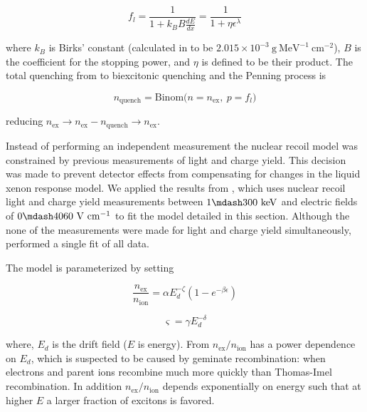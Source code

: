 \begin{equation}
f_l = \frac{1}{1 + k_{B}B \frac{dE}{dx}} = \frac{1}{1 + \eta \epsilon^{\lambda}}
\label{eq:er_nr_calibrations_parameter_determ_nr_birks}
\end{equation}

\noindent where $k_B$ is Birks' constant (calculated in  to be $2.015 \times 10^{-3}\ \mathrm{g\ MeV^{-1}\ cm^{-2}}$),
$B$ is the coefficient for the stopping power, and $\eta$ is defined to be their product.  The total quenching from to biexcitonic
quenching
and the Penning process is

\begin{equation}
n_{\mathrm{quench}} = \mathrm{Binom} \big( n = n_{\mathrm{ex}},\ p = f_l \big)
\end{equation}

\noindent reducing $n_{\mathrm{ex}} \rightarrow n_{\mathrm{ex}} - n_{\mathrm{quench}} \rightarrow n_{\mathrm{ex}}$.

Instead of performing an independent measurement the nuclear recoil model was constrained by previous measurements of light and charge
yield.  This decision was made to prevent detector effects from compensating for changes
in the liquid xenon response model.  We applied the results from , which uses nuclear recoil light and charge yield
measurements between $1 \mdash 300\ \mathrm{keV}$ and electric fields of $0 \mdash 4060\ \mathrm{V\ cm^{-1}}$ to fit the model
detailed in this section.  Although the none of the measurements were made for light and charge yield simultaneously, 
performed a single fit of all data.

The model is parameterized by setting

\begin{equation}
\frac{n_{\mathrm{ex}}}{n_{\mathrm{ion}}} = \alpha E_{d}^{-\zeta} ( 1 - e^{-\beta \epsilon})
\label{eq:er_nr_calibrations_parameter_determ_nr_nex_nion}
\end{equation}

\begin{equation}
\varsigma = \gamma E_{d}^{- \delta}
\label{eq:er_nr_calibrations_parameter_determ_nr_recomb_sigma}
\end{equation}

\noindent where, $E_d$ is the drift field ($E$ is energy).  From 
$n_{\mathrm{ex}} / n_{\mathrm{ion}}$ has a power dependence on $E_d$,
which is suspected to be caused by geminate recombination: when electrons and parent ions recombine much more quickly than Thomas-Imel
recombination.  In addition $n_{\mathrm{ex}} / n_{\mathrm{ion}}$ depends exponentially on energy such that at higher $E$ a larger fraction
of excitons is favored.

